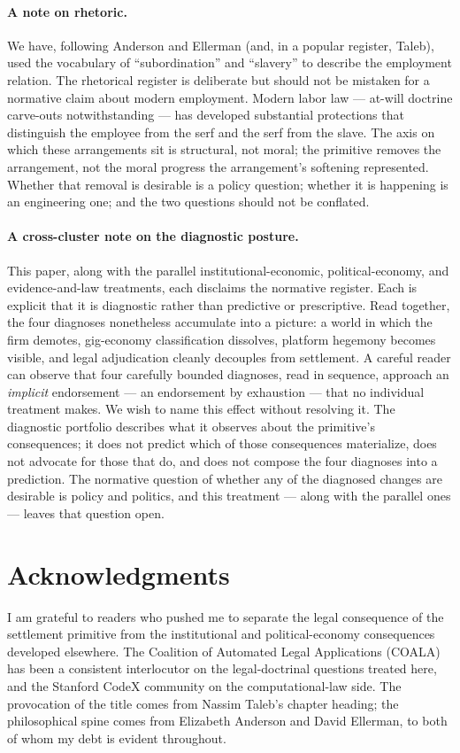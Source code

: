 \documentclass[11pt,a4paper]{article}
\theoremstyle{remark}
\begin{document}
\paragraph{A note on rhetoric.}
We have, following Anderson and Ellerman (and, in a popular
register, Taleb), used the vocabulary of ``subordination'' and
``slavery'' to describe the employment relation. The rhetorical
register is deliberate but should not be mistaken for a normative
claim about modern employment. Modern labor law --- at-will
doctrine carve-outs notwithstanding --- has developed substantial
protections that distinguish the employee from the serf and the
serf from the slave. The axis on which these arrangements sit is
structural, not moral; the primitive removes the arrangement, not
the moral progress the arrangement's softening represented.
Whether that removal is desirable is a policy question; whether
it is happening is an engineering one; and the two questions
should not be conflated.

\paragraph{A cross-cluster note on the diagnostic posture.}
This paper, along with the parallel institutional-economic,
political-economy, and evidence-and-law treatments, each
disclaims the normative register. Each is explicit that it is
diagnostic rather than predictive or prescriptive. Read
together, the four diagnoses nonetheless accumulate into a
picture: a world in which the firm demotes, gig-economy
classification dissolves, platform hegemony becomes visible, and
legal adjudication cleanly decouples from settlement. A careful
reader can observe that four carefully bounded diagnoses, read
in sequence, approach an \emph{implicit} endorsement --- an
endorsement by exhaustion --- that no individual treatment
makes. We wish to name this effect without resolving it. The
diagnostic portfolio describes what it observes about the
primitive's consequences; it does not predict which of those
consequences materialize, does not advocate for those that do,
and does not compose the four diagnoses into a prediction. The
normative question of whether any of the diagnosed changes are
desirable is policy and politics, and this treatment --- along
with the parallel ones --- leaves that question open.

\section*{Acknowledgments}
I am grateful to readers who pushed me to separate the legal
consequence of the settlement primitive from the institutional
and political-economy consequences developed elsewhere. The
Coalition of Automated Legal Applications (COALA) has been a
consistent interlocutor on the legal-doctrinal questions treated
here, and the Stanford CodeX community on the computational-law
side. The provocation of the title comes from Nassim Taleb's
chapter heading; the philosophical spine comes from Elizabeth
Anderson and David Ellerman, to both of whom my debt is evident
throughout.
\end{document}
